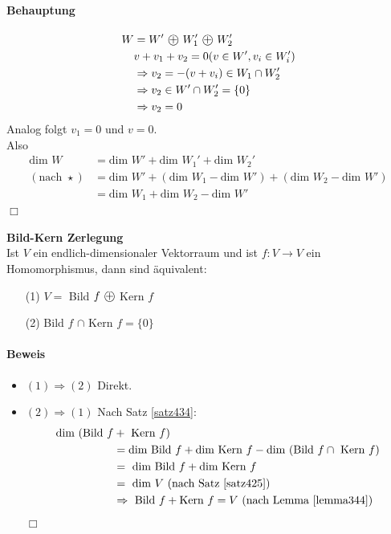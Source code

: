 \documentclass[11pt]{report}
\newcommand*\directsum{%
\text{ \textcircled{+} }
}
\newcommand*\f[1] {\textbf{#1}}
\begin{document}
\paragraph{Behauptung}
\begin{align}
 W &= W' \directsum W_1' \directsum W_2'\\
 &v + v_1 + v_2 = 0 (v \in W', v_i \in W_i') \\
&\Rightarrow v_2 = -(v + v_i) \in W_1 \cap W_2' \\
&\Rightarrow v_2 \in W' \cap W_2' = \{0\} \\
&\Rightarrow v_2 = 0 \\
\end{align}
Analog folgt $v_1 = 0$ und $v=0$.\\
Also
\begin{align}
\text{dim } W &= \text{dim } W' + \text{dim } W_1' + \text{dim } W_2' \\
(\text{nach }  \star) &= \text{dim } W' + (\text{dim } W_1 - \text{dim } W') + (\text{dim } W_2 - \text{dim } W') \\
&= \text{dim } W_1 + \text{dim } W_2 - \text{dim } W'
\end{align}
\hspace*{1cm}\hfill $\Box$
\newpage
\begin{korollar} \f{Bild-Kern Zerlegung} {\ \\}
\label{korollar435} 
Ist $V$ ein endlich-dimensionaler Vektorraum und ist $f: V \rightarrow V$ ein Homomorphismus, dann sind äquivalent:
\begin{itemize}
 \item[(1)] $V =$ Bild $f \directsum$Kern $f$
 \item[(2)] Bild $f$ $\cap$ Kern $f = \{0\}$
\end{itemize}
\end{korollar}

\paragraph{Beweis}
\begin{itemize}
 \item $(1) \Rightarrow (2)$ Direkt.
 \item $(2) \Rightarrow (1)$ Nach Satz \ref{satz434}:
\begin{align}
\text{dim (Bild }f &+ \text{ Kern } f) \\ &= \text{dim Bild } f + \text{dim Kern } f - \text{dim (Bild }f \cap \text{ Kern } f) \\
&= \text{ dim Bild } f + \text{dim Kern } f \\
&= \text{ dim }V \text{ (nach Satz \ref{satz425})} \\
&\Rightarrow \text{ Bild } f + \text{Kern } f = V \text{ (nach Lemma \ref{lemma344})}
\end{align}
\hspace*{1cm}\hfill $\Box$
\end{itemize}
\end{document}
